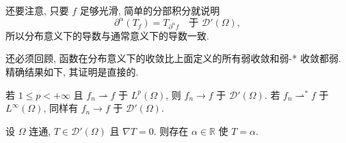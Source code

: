 还要注意, 只要 $f$ 足够光滑, 简单的分部积分就说明
\[
  \partial^\alpha(T_f)=T_{\partial^\alpha f}
  \quad\text{于 $\mathcal{D}'(\Omega)$},
\]
所以分布意义下的导数与通常意义下的导数一致.

还必须回顾, 函数在分布意义下的收敛比上面定义的所有弱收敛和弱-* 收敛都弱. 精确结果如下, 其证明是直接的.

\begin{Proposition}
\label{prop:chap2-weak-convergence-implies-distribution}
若 $1\leq p<+\infty$ 且 $f_n\rightharpoonup f$ 于 $L^p(\Omega)$, 则 $f_n\to f$ 于 $\mathcal{D}'(\Omega)$. 若 $f_n\rightharpoonup^* f$ 于 $L^\infty(\Omega)$, 同样有 $f_n\to f$ 于 $\mathcal{D}'(\Omega)$.
\end{Proposition}

\begin{Lemma}
\label{lem:chap2-zero-gradient-distribution-constant}
设 $\Omega$ 连通, $T\in\mathcal{D}'(\Omega)$ 且 $\nabla T=0$. 则存在 $\alpha\in\mathbb{R}$ 使 $T=\alpha$.
\end{Lemma}

